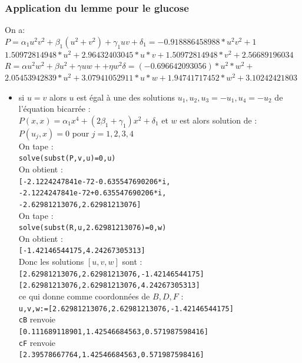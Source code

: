 \documentclass[a4paper,11pt]{book}
\begin{document}
\subsubsection{Application du lemme pour le glucose}
On a:\\
$P=\alpha_1 u^2v^2+\beta_1(u^2+v^2)+\gamma_1 uv+\delta_1=-0.918886458988*u^2v^2+1$\\
$1.50972814948*u^2+2.96432403045*u*v+1.50972814948*v^2+2.56689196034$\\
$R=\alpha u^2w^2+\beta u^2+\gamma uw++\eta w^2\delta=(-0.696642093056)*u^2*w^2+$\\
$2.05453942839*u^2+3.07941052911*u*w+1.94741717452*w^2+3.10242421803$
\begin{itemize}
\item si $u=v$ alors $u$ est \'egal \`a une des solutions 
$u_1,u_2,u_3=-u_1,u_4=-u_2$ de l'\'equation bicarr\'ee :\\
$P(x,x)=\alpha_1 x^4+(2\beta_1+\gamma_1) x^2+\delta_1$ et $w$ est alors 
solution de :\\
$P(u_{j},x)=0$ pour $j=1,2,3,4$\\
On tape :\\
{\tt solve(subst(P,v,u)=0,u)}\\
On obtient :\\
{\tt [-2.1224247841e-72-0.635547690206*i,}\\
{\tt -2.1224247841e-72+0.635547690206*i,}\\
{\tt -2.62981213076,2.62981213076]}\\
On tape :\\
{\tt solve(subst(R,u,2.62981213076)=0,w)}\\
On obtient :\\
{\tt [-1.42146544175,4.24267305313]}\\
Donc les solutions $[u,v,w]$ sont :\\
{\tt [2.62981213076,2.62981213076,-1.42146544175]}\\
{\tt [2.62981213076,2.62981213076,4.24267305313]}\\
ce qui donne comme coordonn\'ees de $B,D,F$ :\\
{\tt u,v,w:=[2.62981213076,2.62981213076,-1.42146544175]}\\
{\tt cB} renvoie \\
{\tt [0.111689118901,1.42546684563,0.571987598416]}\\
{\tt cF} renvoie \\
{\tt [2.39578667764,1.42546684563,0.571987598416]}\\

\end{itemize}
\end{document}
